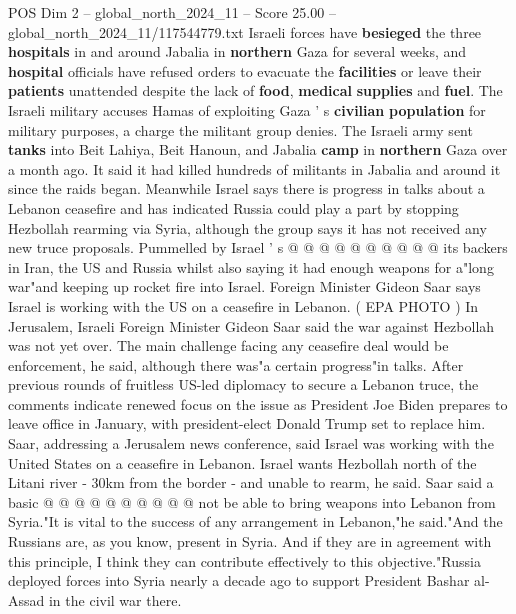 \begin{textsample}{POS Dim 2 – global\_north\_2024\_11 – Score 25.00 – global\_north\_2024\_11/117544779.txt}
Israeli forces have \textbf{besieged} the three \textbf{hospitals} in and around Jabalia in \textbf{northern} Gaza for several weeks, and \textbf{hospital} officials have refused orders to evacuate the \textbf{facilities} or leave their \textbf{patients} unattended despite the lack of \textbf{food}, \textbf{medical} \textbf{supplies} and \textbf{fuel}.
The Israeli military accuses Hamas of exploiting Gaza ' s \textbf{civilian} \textbf{population} for military purposes, a charge the militant group denies.
The Israeli army sent \textbf{tanks} into Beit Lahiya, Beit Hanoun, and Jabalia \textbf{camp} in \textbf{northern} Gaza over a month ago.
It said it had killed hundreds of militants in Jabalia and around it since the raids began.
Meanwhile Israel says there is progress in talks about a Lebanon ceasefire and has indicated Russia could play a part by stopping Hezbollah rearming via Syria, although the group says it has not received any new truce proposals.
Pummelled by Israel ' s @ @ @ @ @ @ @ @ @ @ its backers in Iran, the US and Russia whilst also saying it had enough weapons for a"long war"and keeping up rocket fire into Israel.
Foreign Minister Gideon Saar says Israel is working with the US on a ceasefire in Lebanon. ( EPA PHOTO ) In Jerusalem, Israeli Foreign Minister Gideon Saar said the war against Hezbollah was not yet over.
The main challenge facing any ceasefire deal would be enforcement, he said, although there was"a certain progress"in talks.
After previous rounds of fruitless US-led diplomacy to secure a Lebanon truce, the comments indicate renewed focus on the issue as President Joe Biden prepares to leave office in January, with president-elect Donald Trump set to replace him.
Saar, addressing a Jerusalem news conference, said Israel was working with the United States on a ceasefire in Lebanon.
Israel wants Hezbollah north of the Litani river - 30km from the border - and unable to rearm, he said.
Saar said a basic @ @ @ @ @ @ @ @ @ @ not be able to bring weapons into Lebanon from Syria."It is vital to the success of any arrangement in Lebanon,"he said."And the Russians are, as you know, present in Syria.
And if they are in agreement with this principle, I think they can contribute effectively to this objective."Russia deployed forces into Syria nearly a decade ago to support President Bashar al-Assad in the civil war there.

\end{textsample}
